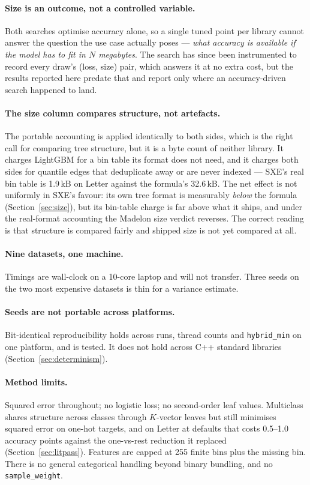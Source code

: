 \documentclass[11pt,a4paper]{article}
\newcommand{\code}[1]{\texttt{\small #1}}
\newcommand{\SXE}{\textsc{SXE}}
\theoremstyle{definition}
\begin{document}
\paragraph{Size is an outcome, not a controlled variable.} Both searches
optimise accuracy alone, so a single tuned point per library cannot answer the
question the use case actually poses --- \emph{what accuracy is available if the
model has to fit in $N$ megabytes}. The search has since been instrumented to
record every draw's (loss, size) pair, which answers it at no extra cost, but
the results reported here predate that and report only where an accuracy-driven
search happened to land.

\paragraph{The size column compares structure, not artefacts.} The portable
accounting is applied identically to both sides, which is the right call for
comparing tree structure, but it is a byte count of neither library. It charges
LightGBM for a bin table its format does not need, and it charges both sides for
quantile edges that deduplicate away or are never indexed --- \SXE's real bin
table is 1.9\,kB on Letter against the formula's 32.6\,kB. The net effect is not
uniformly in \SXE's favour: its own tree format is measurably \emph{below} the
formula (Section~\ref{sec:size}), but its bin-table charge is far above what it
ships, and under the real-format accounting the Madelon size verdict reverses.
The correct reading is that structure is compared fairly and shipped size is
not yet compared at all.

\paragraph{Nine datasets, one machine.} Timings are wall-clock on a 10-core
laptop and will not transfer. Three seeds on the two most expensive datasets is
thin for a variance estimate.

\paragraph{Seeds are not portable across platforms.} Bit-identical
reproducibility holds across runs, thread counts and \code{hybrid\_min} on one
platform, and is tested. It does not hold across C++ standard libraries
(Section~\ref{sec:determinism}).

\paragraph{Method limits.} Squared error throughout; no logistic loss; no
second-order leaf values. Multiclass shares structure across classes through
$K$-vector leaves but still minimises squared error on one-hot targets, and on
Letter at defaults that costs 0.5--1.0 accuracy points against the one-vs-rest
reduction it replaced (Section~\ref{sec:litpass}). Features are capped at 255 finite
bins plus the missing bin. There is no general categorical handling beyond
binary bundling, and no \code{sample\_weight}.
\end{document}
